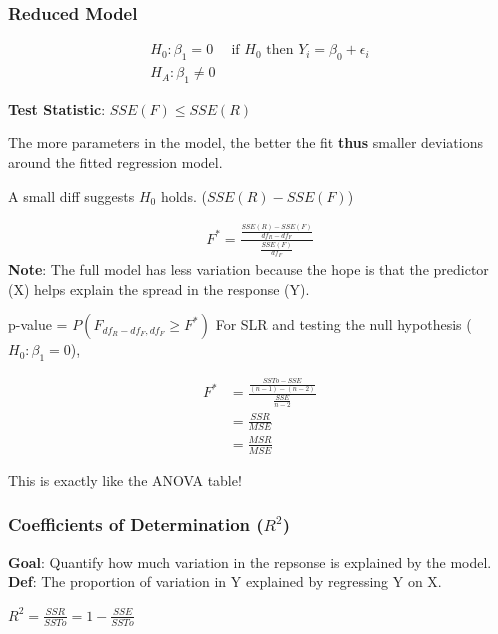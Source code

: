 \documentclass[11pt]{article}
\begin{document}
\subsubsection{Reduced Model}
\label{sec:orgbde6665}
\begin{equation}
\begin{split}
H_0: \beta_1 = 0 & \text{ if $H_0$ then $Y_i = \beta_0 + \epsilon_i$} \\
H_A: \beta_1 \neq 0 &
\end{split}
\end{equation}

\textbf{Test Statistic}: \(SSE(F) \leq SSE(R)\)

The more parameters in the model, the better the fit \textbf{thus} smaller deviations
around the fitted regression model.

A small diff suggests \(H_0\) holds. (\(SSE(R) - SSE(F)\))

\begin{equation}
\begin{split}
F^* = \frac{\frac{SSE(R) - SSE(F)}{df_R - df_F}}{\frac{SSE(F)}{df_F}}
\end{split}
\end{equation}
\textbf{Note}: The full model has less variation because the hope is that the predictor
 (X) helps explain the spread in the response (Y).

p-value = \(P(F_{df_R - df_F, df_F} \geq F^*)\)
For SLR and testing the null hypothesis (\(H_0: \beta_1 = 0\)),

\begin{equation}
\begin{split}
F^* & = \frac{\frac{SSTo - SSE}{(n - 1) - (n - 2)}}{\frac{SSE}{n - 2}}\\
& = \frac{SSR}{MSE}\\
& = \frac{MSR}{MSE}
\end{split}
\end{equation}

This is exactly like the ANOVA table!

\subsubsection{Coefficients of Determination (\(R^2\))}
\label{sec:org5be9f42}

\textbf{Goal}: Quantify how much variation in the repsonse is explained by the model.
\textbf{Def}: The proportion of variation in Y explained by regressing Y on X.

\(R^2 =\frac{SSR}{SSTo} = 1 - \frac{SSE}{SSTo}\)
\end{document}
